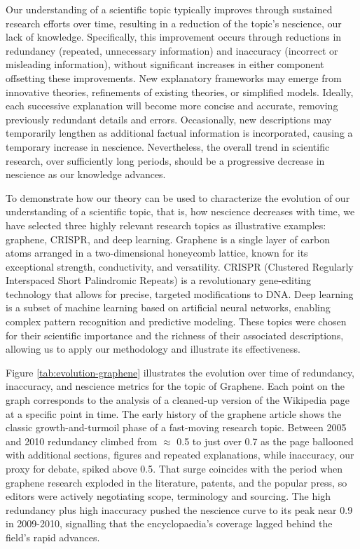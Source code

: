 Our understanding of a scientific topic typically improves through sustained research efforts over time, resulting in a reduction of the topic's nescience, our lack of knowledge. Specifically, this improvement occurs through reductions in redundancy (repeated, unnecessary information) and inaccuracy (incorrect or misleading information), without significant increases in either component offsetting these improvements. New explanatory frameworks may emerge from innovative theories, refinements of existing theories, or simplified models. Ideally, each successive explanation will become more concise and accurate, removing previously redundant details and errors. Occasionally, new descriptions may temporarily lengthen as additional factual information is incorporated, causing a temporary increase in nescience. Nevertheless, the overall trend in scientific research, over sufficiently long periods, should be a progressive decrease in nescience as our knowledge advances.

To demonstrate how our theory can be used to characterize the evolution of our understanding of a scientific topic, that is, how nescience decreases with time, we have selected three highly relevant research topics as illustrative examples: graphene, CRISPR, and deep learning. Graphene is a single layer of carbon atoms arranged in a two-dimensional honeycomb lattice, known for its exceptional strength, conductivity, and versatility. CRISPR (Clustered Regularly Interspaced Short Palindromic Repeats) is a revolutionary gene-editing technology that allows for precise, targeted modifications to DNA. Deep learning is a subset of machine learning based on artificial neural networks, enabling complex pattern recognition and predictive modeling. These topics were chosen for their scientific importance and the richness of their associated descriptions, allowing us to apply our methodology and illustrate its effectiveness.

Figure \ref{tab:evolution-graphene} illustrates the evolution over time of redundancy, inaccuracy, and nescience metrics for the topic of Graphene. Each point on the graph corresponds to the analysis of a cleaned-up version of the Wikipedia page at a specific point in time. The early history of the graphene article shows the classic growth-and-turmoil phase of a fast-moving research topic. Between 2005 and 2010 redundancy climbed from $\approx$ 0.5 to just over 0.7 as the page ballooned with additional sections, figures and repeated explanations, while inaccuracy, our proxy for debate, spiked above 0.5. That surge coincides with the period when graphene research exploded in the literature, patents, and the popular press, so editors were actively negotiating scope, terminology and sourcing. The high redundancy plus high inaccuracy pushed the nescience curve to its peak near 0.9 in 2009-2010, signalling that the encyclopaedia's coverage lagged behind the field's rapid advances.

